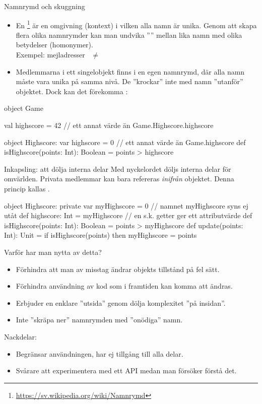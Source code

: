 \begin{Slide}{Namnrymd och skuggning}
\begin{itemize}\SlideFontSmall
  \item En \footnote{\url{https://sv.wikipedia.org/wiki/Namnrymd}}   är en omgivning (kontext) i vilken alla namn är unika. Genom att skapa flera olika namnrymder
  kan man undvika '''' mellan lika namn med olika betydelser (homonymer). \\
  Exempel: mejladresser   ~$\neq$~  
  \item Medlemmarna i ett singelobjekt finns i en egen namnrymd,
  där alla namn måste vara unika på samma nivå. De ''krockar'' inte med namn ''utanför'' objektet. Dock kan det förekomma  :
\end{itemize}
\begin{Code}
object Game {

  val highscore = 42   // ett annat värde än Game.Highscore.highscore

  object Highscore:
    var highscore = 0  // ett annat värde än Game.highscore
    def isHighscore(points: Int): Boolean = points > highscore
}
\end{Code}

\end{Slide}



\begin{Slide}{Inkapsling: att dölja interna delar}\SlideFontSmall
Med nyckelordet  döljs interna delar för omvärlden.
Privata medlemmar kan bara refereras \emph{inifrån} objektet.
Denna princip kallas  .
\begin{CodeSmall}
object Highscore:
  private var myHighscore = 0        // namnet myHighscore syns ej utåt
  def highscore: Int = myHighscore   // en s.k. getter ger ett attributvärde
  def isHighscore(points: Int): Boolean = points > myHighscore
  def update(points: Int): Unit = if isHighscore(points) then myHighscore = points
\end{CodeSmall}
\pause
Varför har man nytta av detta?
\begin{itemize}
  \item Förhindra att man av misstag ändrar objekts tillstånd på fel sätt.
  \item Förhindra användning av kod som i framtiden kan komma att ändras.
  \item Erbjuder en enklare ''utsida'' genom dölja komplexitet ''på insidan''.
  \item Inte ''skräpa ner'' namnrymden med ''onödiga'' namn.
\end{itemize}
Nackdelar:
\begin{itemize}
  \item Begränsar användningen, har ej tillgång till alla delar.
  \item Svårare att experimentera med ett API medan man försöker förstå det.
\end{itemize}
\end{Slide}



